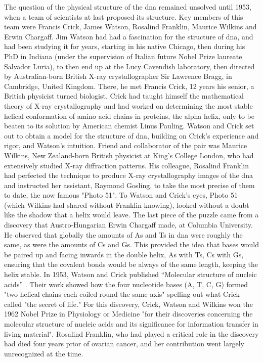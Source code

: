 The question of the physical structure of the \gls{dna} remained unsolved until 1953, when a team of scientists at last proposed its structure. 
Key members of this team were Francis Crick, James Watson, Rosalind Franklin, Maurice Wilkins and Erwin Chargaff. 
Jim Watson had had a fascination for the structure of \gls{dna}, and had been studying it for years, starting in his native Chicago, then during his PhD in Indiana (under the supervision of Italian future Nobel Prize laureate Salvador Luria), to then end up at the Lucy Cavendish laboratory, then directed by Australian-born British X-ray crystallographer Sir Lawrence Bragg, in Cambridge, United Kingdom. 
There, he met Francis Crick, 12 years his senior, a British physicist turned biologist. 
Crick had taught himself the mathematical theory of X-ray crystallography and had worked on determining the most stable helical conformation of amino acid chains in proteins, the alpha helix, only to be beaten to its solution by American chemist Linus Pauling. 
Watson and Crick set out to obtain a model for the structure of \gls{dna}, building on Crick’s experience and rigor, and Watson’s intuition. 
Friend and collaborator of the pair was Maurice Wilkins, New Zealand-born British physicist at King’s College London, who had extensively studied X-ray diffraction patterns. 
His colleague, Rosalind Franklin had perfected the technique to produce X-ray crystallography images of the \gls{dna} and instructed her assistant, Raymond Gosling, to take the most precise of them to date, the now famous "Photo 51". 
To Watson and Crick’s eyes, Photo 51 (which Wilkins had shared without Franklin knowing), looked without a doubt like the shadow that a helix would leave. 
The last piece of the puzzle came from a discovery that Austro-Hungarian Erwin Chargaff made, at Columbia University. He observed that globally the amounts of As and Ts in \gls{dna} were roughly the same, as were the amounts of Cs and Gs. 
This provided the idea that bases would be paired up and facing inwards in the double helix, As with Ts, Cs with Gs, ensuring that the covalent bonds would be always of the same length, keeping the helix stable. 
In 1953, Watson and Crick published “Molecular structure of nucleic acids” \cite{watson1953molecular}. 
Their work showed how the four nucleotide bases (A, T, C, G) formed "two helical chains each coiled round the same axis" \cite{watson1953molecular} spelling out what Crick called "the secret of life." 
For this discovery, Crick, Watson and Wilkins won the 1962 Nobel Prize in Physiology or Medicine "for their discoveries concerning the molecular structure of nucleic acids and its significance for information transfer in living material". 
Rosalind Franklin, who had played a critical role in the discovery had died four years prior of ovarian cancer, and her contribution went largely unrecognized at the time.

